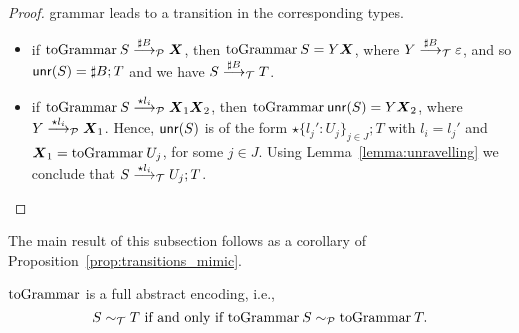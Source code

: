 \begin{proof}
	grammar leads to a transition in the corresponding types.
	\begin{itemize}
		\item if $\toGrammarf{S}\LTSderivesP[\sharp B] \vec X$, then
		$\toGrammarf{S} = Y \vec X$, where $Y\LTSderives[\sharp B] \varepsilon$,
		and so $\Unravel(S) = \sharp B; T$ and we have $S\LTSderives[\sharp B] T$.
		\item if $\toGrammarf{S} \LTSderivesP[\star l_i] \vec X_1 \vec X_2$, then
		$\toGrammarf{\Unravel(S)} = Y \vec X_2$, where $Y\LTSderivesP[\star l_i] \vec X_1$.
		Hence, $\Unravel (S)$ is of the form $\star\{l_j' :U_j\}_{j\in J};T$ with $l_i = l_j'$ and
		$\vec X_1 = \toGrammarf{U_j}$, for some $j\in J$. Using 
		Lemma~\ref{lemma:unravelling} we conclude that 
		$S \LTSderives[\star l_i] U_j ; T$.
	\end{itemize}
\end{proof}


The main result of this subsection follows as a corollary
of Proposition~\ref{prop:transitions_mimic}.

\begin{theorem}
\label{thm:equiv_coincide}
	$\toGrammark$ is a full abstract encoding, i.e.,
	$$S \TypeEquiv T \text{ if and only if } 
	\toGrammarf{S} \ProdEquiv \toGrammarf{T}.$$
\end{theorem}



